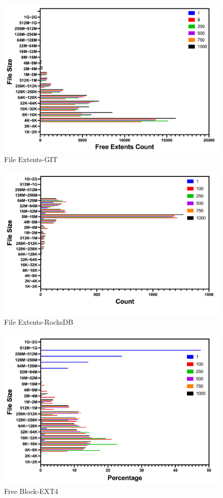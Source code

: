 \begin{figure}[t]
    \centering
	\includegraphics[width=0.95\columnwidth]{graphs/file_extents_git}
	\caption{File Extents-GIT}
	\label{f:file_extents_git}
\end{figure}

\begin{figure}[t]
    \centering
	\includegraphics[width=0.95\columnwidth]{graphs/file_extents_rocksdb}
	\caption{File Extents-RocksDB}
	\label{f:file_extents_rocksdb}
\end{figure}

\begin{figure}[t]
    \centering
	\includegraphics[width=0.95\columnwidth]{graphs/free_block_ext4}
	\caption{Free Block-EXT4}
	\label{f:free_block_ext4}
\end{figure}

